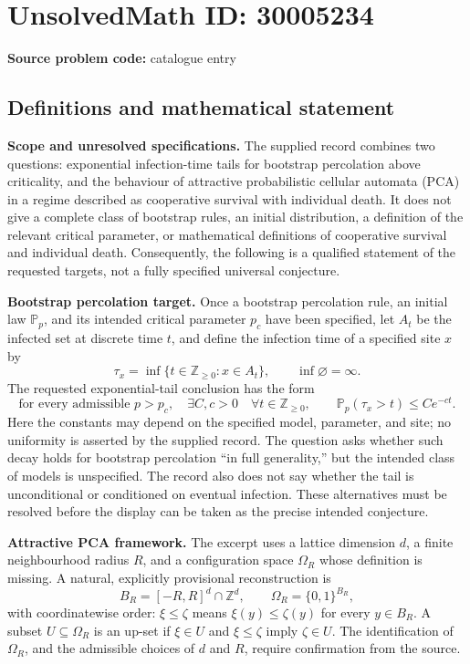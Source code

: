 \documentclass[11pt]{article}
\newcommand{\Z}{\mathbb{Z}}
\begin{document}
\section*{UnsolvedMath ID: 30005234}
\textbf{Source problem code:} catalogue entry
\subsection{Definitions and mathematical statement}
\textbf{Scope and unresolved specifications.} The supplied record combines two questions: exponential infection-time tails for bootstrap percolation above criticality, and the behaviour of attractive probabilistic cellular automata (PCA) in a regime described as cooperative survival with individual death. It does not give a complete class of bootstrap rules, an initial distribution, a definition of the relevant critical parameter, or mathematical definitions of cooperative survival and individual death. Consequently, the following is a qualified statement of the requested targets, not a fully specified universal conjecture.

\textbf{Bootstrap percolation target.} Once a bootstrap percolation rule, an initial law \(\mathbb P_p\), and its intended critical parameter \(p_c\) have been specified, let \(A_t\) be the infected set at discrete time \(t\), and define the infection time of a specified site \(x\) by
\[
\tau_x=\inf\{t\in\Z_{\geq0}:x\in A_t\},\qquad \inf\varnothing=\infty.
\]
The requested exponential-tail conclusion has the form
\[
\text{for every admissible }p>p_c,\quad
\exists C,c>0\quad\forall t\in\Z_{\geq0},\qquad
\mathbb P_p(\tau_x>t)\leq C e^{-ct}.
\]
Here the constants may depend on the specified model, parameter, and site; no uniformity is asserted by the supplied record. The question asks whether such decay holds for bootstrap percolation ``in full generality,'' but the intended class of models is unspecified. The record also does not say whether the tail is unconditional or conditioned on eventual infection. These alternatives must be resolved before the display can be taken as the precise intended conjecture.

\textbf{Attractive PCA framework.} The excerpt uses a lattice dimension \(d\), a finite neighbourhood radius \(R\), and a configuration space \(\Omega_R\) whose definition is missing. A natural, explicitly provisional reconstruction is
\[
B_R=[-R,R]^d\cap\Z^d,\qquad \Omega_R=\{0,1\}^{B_R},
\]
with coordinatewise order: \(\xi\leq\zeta\) means \(\xi(y)\leq\zeta(y)\) for every \(y\in B_R\). A subset \(U\subseteq\Omega_R\) is an up-set if \(\xi\in U\) and \(\xi\leq\zeta\) imply \(\zeta\in U\). The identification of \(\Omega_R\), and the admissible choices of \(d\) and \(R\), require confirmation from the source.
\end{document}

